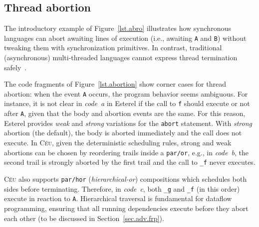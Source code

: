 \documentclass{acm_proc_article-sp}
\newcommand{\CEU}{\textsc{C\'{e}u}\xspace}
\newcommand{\code}[1] {{\small{\texttt{#1}}}}
\newcommand{\1}{\;}
\newcommand{\2}{\;\;}
\newcommand{\3}{\;\;\;}
\newcommand{\5}{\;\;\;\;\;}
\begin{document}
\subsection{Thread abortion}
\label{sec.ceu.abrt}

The introductory example of Figure~\ref{lst.abro} illustrates how synchronous 
languages can abort awaiting lines of execution (i.e., awaiting \code{A} and 
\code{B}) without tweaking them with synchronization primitives.
In contrast, traditional (asynchronous) multi-threaded languages cannot express 
thread termination safely~\cite{esterel.preemption,sync_async.threadsstop}.

The code fragments of Figure~\ref{lst.abortion} show corner cases for thread 
abortion: when the event \code{A} occurs, the program behavior seems ambiguous.
%
For instance, it is not clear in \emph{code~a} in Esterel if the call to 
\code{f} should execute or not after \code{A}, given that the body and abortion 
events are the same.
%
For this reason, Esterel provides \emph{weak} and \emph{strong} variations for 
the \code{abort} statement.
With \emph{strong} abortion (the default), the body is aborted immediately and 
the call does not execute.
%
In \CEU, given the deterministic scheduling rules, strong and weak abortions 
can be chosen by reordering trails inside a \code{par/or}, e.g., in 
\emph{code~b}, the second trail is strongly aborted by the first trail and the 
call to \code{\_f} never executes.

\CEU also supports \code{par/hor} (\emph{hierarchical-or}) compositions which 
schedules both sides before terminating.
Therefore, in \emph{code~c}, both \code{\_g} and \code{\_f} (in this order) 
execute in reaction to \code{A}.
Hierarchical traversal is fundamental for dataflow programming, ensuring that 
all running dependencies execute before they abort each other (to be discussed 
in Section~\ref{sec.adv.frp}).

\end{document}
